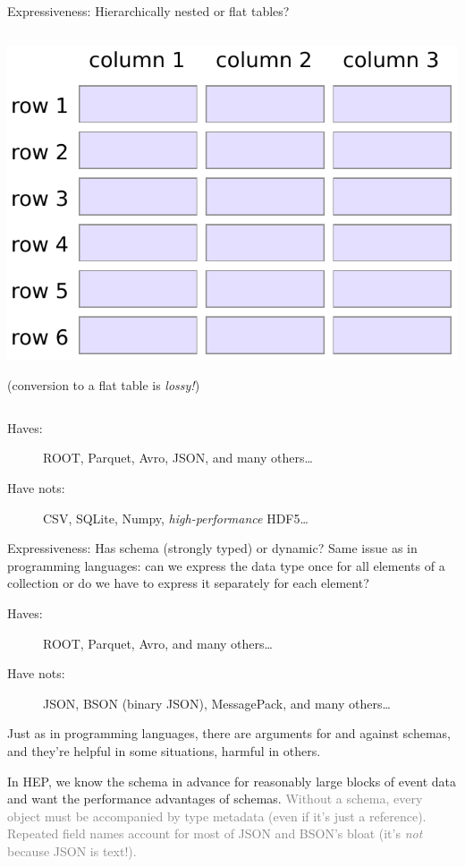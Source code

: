 \documentclass[aspectratio=169]{beamer}
\begin{document}
\begin{frame}{Expressiveness: Hierarchically nested or flat tables?}
\begin{columns}[t]
\begin{center}
\vspace{0.2 cm}
\includegraphics[width=0.7\linewidth]{table-structure.pdf}

\small (conversion to a flat table is {\it lossy!})

\end{center}
\end{columns}

\vspace{0.25 cm}

\begin{description}
\item[Haves:] ROOT, Parquet, Avro, JSON, and many others\ldots
\item[Have nots:] CSV, SQLite, Numpy, {\it high-performance} HDF5\ldots
\end{description}
\end{frame}

\begin{frame}{Expressiveness: Has schema (strongly typed) or dynamic?}
\vspace{0.5 cm}
Same issue as in programming languages: can we express the data type once for all elements of a collection or do we have to express it separately for each element?

\vfill

\begin{description}
\item[Haves:] ROOT, Parquet, Avro, and many others\ldots
\item[Have nots:] JSON, BSON (binary JSON), MessagePack, and many others\ldots
\end{description}

\vfill

Just as in programming languages, there are arguments for and against schemas, and they're helpful in some situations, harmful in others.

\vfill

In HEP, we know the schema in advance for reasonably large blocks of event data and want the performance advantages of schemas. \textcolor{gray}{Without a schema, every object must be accompanied by type metadata (even if it's just a reference). Repeated field names account for most of JSON and BSON's bloat (it's {\it not} because JSON is text!).}
\end{frame}
\end{document}
